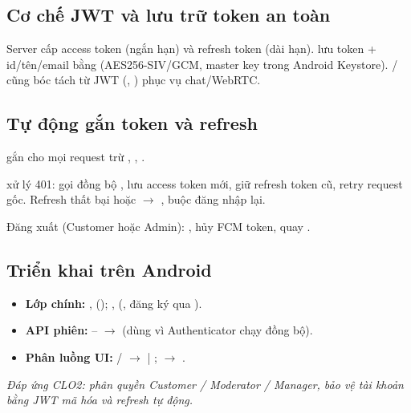 \subsection{Cơ chế JWT và lưu trữ token an toàn}
\label{sec:c2_session}
Server cấp access token (ngắn hạn) và refresh token (dài hạn).
 lưu token + id/tên/email bằng
 (AES256-SIV/GCM, master key trong
Android Keystore).  /  cũng bóc
tách từ JWT (, ) phục vụ chat/WebRTC.

\subsection{Tự động gắn token và refresh}
 gắn  cho mọi request
trừ , , .

 xử lý 401: gọi đồng bộ
, lưu access token mới, giữ refresh token
cũ, retry request gốc. Refresh thất bại hoặc 
$\rightarrow$ , buộc đăng nhập lại.

Đăng xuất (Customer hoặc Admin): , hủy FCM token,
quay .

\subsection{Triển khai trên Android}
\begin{itemize}
    \item \textbf{Lớp chính:} , 
    (); , 
    (, đăng ký qua ).
    \item \textbf{API phiên:}  --
     $\rightarrow$
     (dùng 
    vì Authenticator chạy đồng bộ).
    \item \textbf{Phân luồng UI:}  /
     $\rightarrow$  |
    ;  $\rightarrow$
    .
\end{itemize}

\textit{Đáp ứng CLO2: phân quyền Customer / Moderator / Manager, bảo vệ
tài khoản bằng JWT mã hóa và refresh tự động.}
